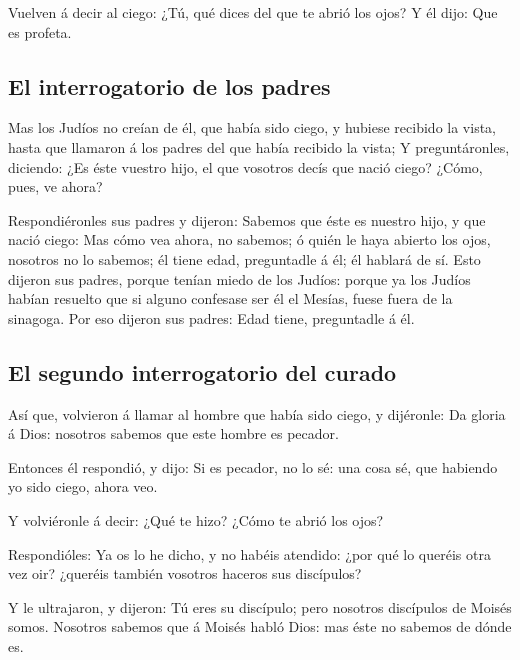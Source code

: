  Vuelven á decir al ciego: ¿Tú, qué dices del que te
abrió los ojos? Y él dijo: Que es profeta.

\hypertarget{el-interrogatorio-de-los-padres}{%
\subsection{El interrogatorio de los
padres}\label{el-interrogatorio-de-los-padres}}

 Mas los Judíos no creían de él, que había sido ciego, y
hubiese recibido la vista, hasta que llamaron á los padres del que había
recibido la vista;  Y preguntáronles, diciendo: ¿Es éste
vuestro hijo, el que vosotros decís que nació ciego? ¿Cómo, pues, ve
ahora?

 Respondiéronles sus padres y dijeron: Sabemos que éste
es nuestro hijo, y que nació ciego:  Mas cómo vea ahora,
no sabemos; ó quién le haya abierto los ojos, nosotros no lo sabemos; él
tiene edad, preguntadle á él; él hablará de sí.  Esto
dijeron sus padres, porque tenían miedo de los Judíos: porque ya los
Judíos habían resuelto que si alguno confesase ser él el Mesías, fuese
fuera de la sinagoga.  Por eso dijeron sus padres: Edad
tiene, preguntadle á él.

\hypertarget{el-segundo-interrogatorio-del-curado}{%
\subsection{El segundo interrogatorio del
curado}\label{el-segundo-interrogatorio-del-curado}}

 Así que, volvieron á llamar al hombre que había sido
ciego, y dijéronle: Da gloria á Dios: nosotros sabemos que este hombre
es pecador.

 Entonces él respondió, y dijo: Si es pecador, no lo sé:
una cosa sé, que habiendo yo sido ciego, ahora veo.

 Y volviéronle á decir: ¿Qué te hizo? ¿Cómo te abrió los
ojos?

 Respondióles: Ya os lo he dicho, y no habéis atendido:
¿por qué lo queréis otra vez oir? ¿queréis también vosotros haceros sus
discípulos?

 Y le ultrajaron, y dijeron: Tú eres su discípulo; pero
nosotros discípulos de Moisés somos.  Nosotros sabemos
que á Moisés habló Dios: mas éste no sabemos de dónde es.

